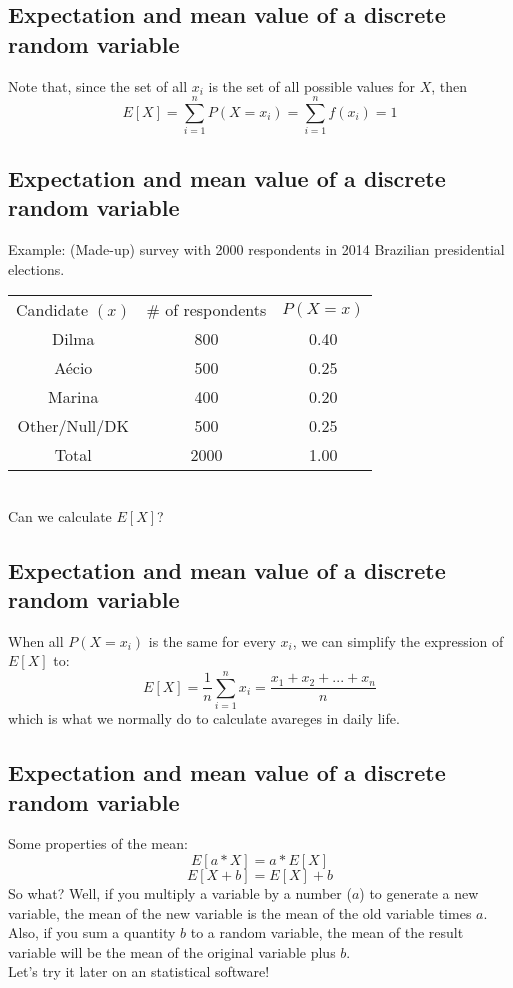 \documentclass[11pt]{article}
\begin{document}
	\subsection*{Expectation and mean value of a discrete random variable}
	Note that, since the set of all $x_i$ is the set of all possible values for $X$, then
	\[E[X] = \sum\limits_{i=1}^n P(X = x_i) = \sum\limits_{i=1}^n f(x_i) = 1\]


	\subsection*{Expectation and mean value of a discrete random variable}
	Example: (Made-up) survey with 2000 respondents in 2014 Brazilian presidential elections.
	\newline\\
		\begin{tabular}{|c|c|c|}
\hline
	Candidate $(x)$ & \# of respondents & $P(X=x)$\\
	\cline{1-3}
	Dilma & 800  & 0.40\\
	Aécio &  500 & 0.25\\
	Marina & 400 & 0.20\\
	Other/Null/DK & 500 & 0.25 \\
	\cline{1-3}
	Total & 2000 & 1.00\\
\hline
\end{tabular}
	\newline\\
	Can we calculate $E[X]$?


	\subsection*{Expectation and mean value of a discrete random variable}
	When all $P(X=x_i)$ is the same for every $x_i$, we can simplify the expression of $E[X]$ to:
	\[E[X] = \frac{1}{n}\sum\limits_{i=1}^n x_i = \frac{x_1 + x_2 + ... + x_n}{n}\]
	which is what we normally do to calculate avareges in daily life.

	\subsection*{Expectation and mean value of a discrete random variable}
	Some properties of the mean:
	\[E[a*X] = a * E[X]\]
	\[E[X+ b] = E[X] + b\]
	So what? Well, if you multiply a variable by a number ($a$) to generate a new variable, the mean of the new variable is the mean of the old variable times $a$.
	\newline\\Also, if you sum a quantity $b$ to a random variable, the mean of the result variable will be the mean of the original variable plus $b$.
	\newline\\Let's try it later on an statistical software!
\end{document}
